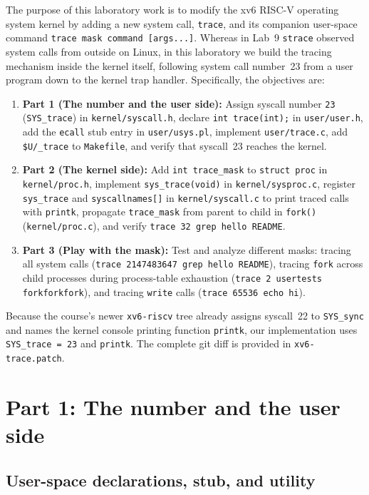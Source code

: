 \documentclass{../latex/utmreport}
\providecommand{\tightlist}{\setlength{\itemsep}{0pt}\setlength{\parskip}{0pt}}
\begin{document}
The purpose of this laboratory work is to modify the xv6 RISC-V operating system kernel by adding a new system call, \texttt{trace}, and its companion user-space command \texttt{trace mask command [args...]}. Whereas in Lab~9 \texttt{strace} observed system calls from outside on Linux, in this laboratory we build the tracing mechanism inside the kernel itself, following system call number~23 from a user program down to the kernel trap handler. Specifically, the objectives are:
\begin{enumerate}
\tightlist
\item \textbf{Part 1 (The number and the user side):} Assign syscall number \texttt{23} (\texttt{SYS\_trace}) in \texttt{kernel/syscall.h}, declare \texttt{int trace(int);} in \texttt{user/user.h}, add the \texttt{ecall} stub entry in \texttt{user/usys.pl}, implement \texttt{user/trace.c}, add \texttt{\$U/\_trace} to \texttt{Makefile}, and verify that syscall~23 reaches the kernel.
\item \textbf{Part 2 (The kernel side):} Add \texttt{int trace\_mask} to \texttt{struct proc} in \texttt{kernel/proc.h}, implement \texttt{sys\_trace(void)} in \texttt{kernel/sysproc.c}, register \texttt{sys\_trace} and \texttt{syscallnames[]} in \texttt{kernel/syscall.c} to print traced calls with \texttt{printk}, propagate \texttt{trace\_mask} from parent to child in \texttt{fork()} (\texttt{kernel/proc.c}), and verify \texttt{trace 32 grep hello README}.
\item \textbf{Part 3 (Play with the mask):} Test and analyze different masks: tracing all system calls (\texttt{trace 2147483647 grep hello README}), tracing \texttt{fork} across child processes during process-table exhaustion (\texttt{trace 2 usertests forkforkfork}), and tracing \texttt{write} calls (\texttt{trace 65536 echo hi}).
\end{enumerate}

Because the course's newer \texttt{xv6-riscv} tree already assigns syscall~22 to \texttt{SYS\_sync} and names the kernel console printing function \texttt{printk}, our implementation uses \texttt{SYS\_trace = 23} and \texttt{printk}. The complete git diff is provided in \texttt{xv6-trace.patch}.

\chapter{Part 1: The number and the user side}

\section{User-space declarations, stub, and utility}
\end{document}
